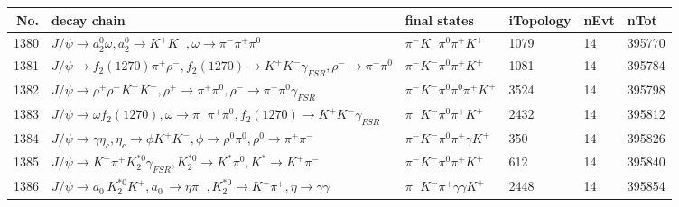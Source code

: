 \begin{table}[htbp] 
\begin{center}
\begin{small}
\begin{tabular}{rlllll}\hline\hline
 No. & decay chain & final states &  iTopology & nEvt & nTot \\\hline
1380&$J/\psi       \rightarrow a_{2}^{0}      \omega         , a_{2}^{0}       \rightarrow K^{+}          K^{-}          , \omega          \rightarrow \pi^{-}        \pi^{+}        \pi^{0}        $&$\pi^{-}        K^{-}          \pi^{0}        \pi^{+}        K^{+}          $& 1079&   14&395770\\
1381&$J/\psi       \rightarrow f_{2}(1270)    \pi^{+}        \rho^{-}      , f_{2}(1270)     \rightarrow K^{+}          K^{-}          \gamma_{FSR} , \rho^{-}       \rightarrow \pi^{-}        \pi^{0}        $&$\pi^{-}        K^{-}          \pi^{0}        \pi^{+}        K^{+}          $& 1081&   14&395784\\
1382&$J/\psi       \rightarrow \rho^{+}      \rho^{-}      K^{+}          K^{-}          , \rho^{+}       \rightarrow \pi^{+}        \pi^{0}        , \rho^{-}       \rightarrow \pi^{-}        \pi^{0}        \gamma_{FSR} $&$\pi^{-}        K^{-}          \pi^{0}        \pi^{0}        \pi^{+}        K^{+}          $& 3524&   14&395798\\
1383&$J/\psi       \rightarrow \omega         f_{2}(1270)    , \omega          \rightarrow \pi^{-}        \pi^{+}        \pi^{0}        , f_{2}(1270)     \rightarrow K^{+}          K^{-}          \gamma_{FSR} $&$\pi^{-}        K^{-}          \pi^{0}        \pi^{+}        K^{+}          $& 2432&   14&395812\\
1384&$J/\psi       \rightarrow \gamma       \eta_{c}    , \eta_{c}     \rightarrow \phi           K^{+}          K^{-}          , \phi            \rightarrow \rho^{0}      \pi^{0}        , \rho^{0}       \rightarrow \pi^{+}        \pi^{-}        $&$\pi^{-}        K^{-}          \pi^{0}        \pi^{+}        \gamma       K^{+}          $&  350&   14&395826\\
1385&$J/\psi       \rightarrow K^{-}          \pi^{+}        K_2^{*0}       \gamma_{FSR} , K_2^{*0}        \rightarrow K^{*}          \pi^{0}        , K^{*}           \rightarrow K^{+}          \pi^{-}        $&$\pi^{-}        K^{-}          \pi^{0}        \pi^{+}        K^{+}          $&  612&   14&395840\\
1386&$J/\psi       \rightarrow a_{0}^{-}      K_2^{*0}       K^{+}          , a_{0}^{-}       \rightarrow \eta          \pi^{-}        , K_2^{*0}        \rightarrow K^{-}          \pi^{+}        , \eta           \rightarrow \gamma       \gamma       $&$\pi^{-}        K^{-}          \pi^{+}        \gamma       \gamma       K^{+}          $& 2448&   14&395854\\

\end{tabular}
\end{small}
\end{center}
\end{table}
